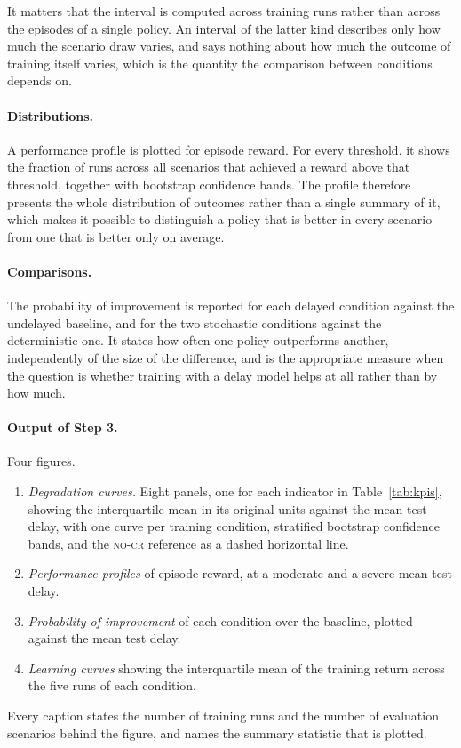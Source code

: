 \documentclass[11pt,a4paper]{article}
\newcommand{\nocr}{\textsc{no-cr}}
\begin{document}
It matters that the interval is computed across training runs rather than across
the episodes of a single policy. An interval of the latter kind describes only
how much the scenario draw varies, and says nothing about how much the outcome
of training itself varies, which is the quantity the comparison between
conditions depends on.

\paragraph{Distributions.} A performance profile is plotted for episode reward.
For every threshold, it shows the fraction of runs across all scenarios that
achieved a reward above that threshold, together with bootstrap confidence
bands. The profile therefore presents the whole distribution of outcomes rather
than a single summary of it, which makes it possible to distinguish a policy
that is better in every scenario from one that is better only on average.

\paragraph{Comparisons.} The probability of improvement is reported for each
delayed condition against the undelayed baseline, and for the two stochastic
conditions against the deterministic one. It states how often one policy
outperforms another, independently of the size of the difference, and is the
appropriate measure when the question is whether training with a delay model
helps at all rather than by how much.

\paragraph{Output of Step 3.} Four figures.

\begin{enumerate}
  \item \emph{Degradation curves.} Eight panels, one for each indicator in
    Table~\ref{tab:kpis}, showing the interquartile mean in its original units
    against the mean test delay, with one curve per training condition,
    stratified bootstrap confidence bands, and the \nocr{} reference as a dashed
    horizontal line.
  \item \emph{Performance profiles} of episode reward, at a moderate and a
    severe mean test delay.
  \item \emph{Probability of improvement} of each condition over the baseline,
    plotted against the mean test delay.
  \item \emph{Learning curves} showing the interquartile mean of the training
    return across the five runs of each condition.
\end{enumerate}

Every caption states the number of training runs and the number of evaluation
scenarios behind the figure, and names the summary statistic that is plotted.

\end{document}
